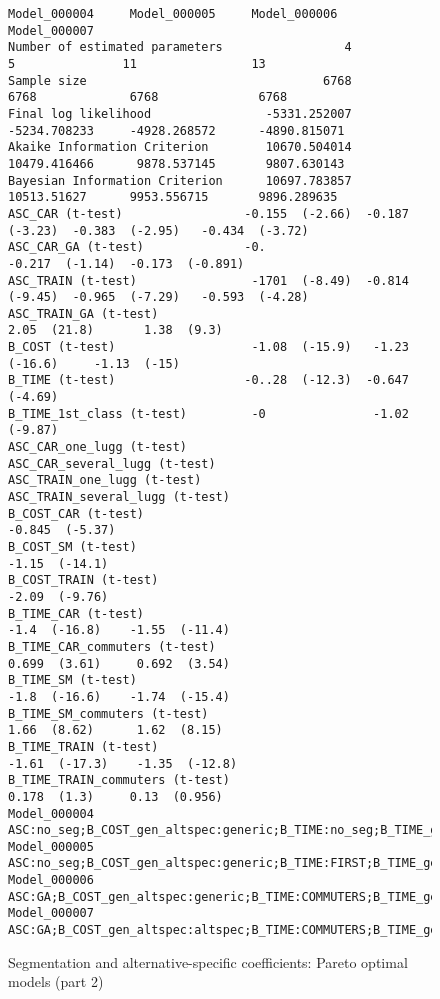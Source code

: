 \documentclass[12pt,a4paper]{article}
\begin{document}
\begin{landscape}
  \begin{figure}[p]
    \begin{lstlisting}[basicstyle=\scriptsize]
                                    Model_000004     Model_000005     Model_000006      Model_000007
Number of estimated parameters                 4                5               11                13
Sample size                                 6768             6768             6768              6768
Final log likelihood                -5331.252007     -5234.708233     -4928.268572      -4890.815071
Akaike Information Criterion        10670.504014     10479.416466      9878.537145       9807.630143
Bayesian Information Criterion      10697.783857      10513.51627      9953.556715       9896.289635
ASC_CAR (t-test)                 -0.155  (-2.66)  -0.187  (-3.23)  -0.383  (-2.95)   -0.434  (-3.72)
ASC_CAR_GA (t-test)              -0.                               -0.217  (-1.14)  -0.173  (-0.891)
ASC_TRAIN (t-test)                -1701  (-8.49)  -0.814  (-9.45)  -0.965  (-7.29)   -0.593  (-4.28)
ASC_TRAIN_GA (t-test)                                                 2.05  (21.8)       1.38  (9.3)
B_COST (t-test)                   -1.08  (-15.9)   -1.23  (-16.6)     -1.13  (-15)
B_TIME (t-test)                  -0..28  (-12.3)  -0.647  (-4.69)
B_TIME_1st_class (t-test)         -0               -1.02  (-9.87)
ASC_CAR_one_lugg (t-test)           
ASC_CAR_several_lugg (t-test)       
ASC_TRAIN_one_lugg (t-test)         
ASC_TRAIN_several_lugg (t-test)     
B_COST_CAR (t-test)                                                                  -0.845  (-5.37)
B_COST_SM (t-test)                                                                    -1.15  (-14.1)
B_COST_TRAIN (t-test)                                                                 -2.09  (-9.76)
B_TIME_CAR (t-test)                                                  -1.4  (-16.8)    -1.55  (-11.4)
B_TIME_CAR_commuters (t-test)                                        0.699  (3.61)     0.692  (3.54)
B_TIME_SM (t-test)                                                   -1.8  (-16.6)    -1.74  (-15.4)
B_TIME_SM_commuters (t-test)                                          1.66  (8.62)      1.62  (8.15)
B_TIME_TRAIN (t-test)                                               -1.61  (-17.3)    -1.35  (-12.8)
B_TIME_TRAIN_commuters (t-test)                                       0.178  (1.3)     0.13  (0.956)
Model_000004	ASC:no_seg;B_COST_gen_altspec:generic;B_TIME:no_seg;B_TIME_gen_altspec:generic
Model_000005	ASC:no_seg;B_COST_gen_altspec:generic;B_TIME:FIRST;B_TIME_gen_altspec:generic
Model_000006	ASC:GA;B_COST_gen_altspec:generic;B_TIME:COMMUTERS;B_TIME_gen_altspec:altspec
Model_000007	ASC:GA;B_COST_gen_altspec:altspec;B_TIME:COMMUTERS;B_TIME_gen_altspec:altspec
\end{lstlisting}
\caption{\label{fig:b05alt_spec_segmentation_2}Segmentation and alternative-specific coefficients: Pareto optimal models (part 2)}
  \end{figure}
\end{landscape}
\end{document}
